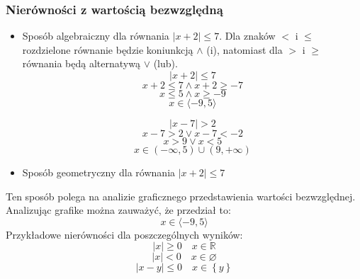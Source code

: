 \documentclass[12pt, a4paper]{article}
\begin{document}
\subsubsection{Nierówności z wartością bezwzględną}
\begin{itemize}
  \item Sposób algebraiczny dla równania $\left|x + 2\right| \leq 7$. Dla znaków $<$ i $\leq$ rozdzielone równanie będzie
    koniunkcją $\wedge$ (i), natomiast dla $>$ i $\geq$ równania będą alternatywą $\vee$ (lub).
      $$\left| x+2 \right| \leq 7$$
      $$x+2 \leq 7 \wedge x+2\geq -7$$
      $$x \leq 5 \wedge x \geq -9$$
      $$x \in \langle -9,5 \rangle$$

      $$\left| x-7 \right| > 2$$
      $$x-7 > 2 \vee x-7 < -2$$
      $$x > 9 \vee x < 5$$
      $$x \in \left(-\infty, 5\right) \cup \left(9, +\infty \right)$$
  \item Sposób geometryczny dla równania $\left|x + 2\right| \leq 7$
    \begin{center}
    \end{center}
\end{itemize}
Ten sposób polega na analizie graficznego przedstawienia wartości bezwzględnej. Analizując grafike można zauważyć, że przedział to:
$$x \in \langle-9, 5\rangle$$
Przykładowe nierówności dla poszczególnych wyników:
$$\left|x\right|\geq0 \quad x \in \mathbb{R}$$
$$\left|x\right|<0 \quad x \in \varnothing$$
$$\left|x - y\right|\leq0 \quad x \in \left\{y\right\}$$
\end{document}
